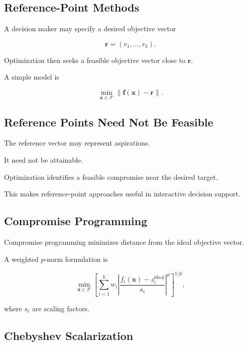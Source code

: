 \subsection{Reference-Point Methods}
\label{subsec:reference-point-methods}

A decision maker may specify a desired objective vector

\[
\boxed{
\mathbf{r}
=
(r_1,\ldots,r_k).
}
\]

Optimization then seeks a feasible objective vector close to
\(\mathbf{r}\).

A simple model is

\[
\boxed{
\min_{\mathbf{x}\in\mathcal{F}}
\|
\mathbf{f}(\mathbf{x})
-
\mathbf{r}
\|.
}
\]

\subsection{Reference Points Need Not Be Feasible}
\label{subsec:reference-points-feasibility}

The reference vector may represent aspirations.

It need not be attainable.

Optimization identifies a feasible compromise near the desired target.

This makes reference-point approaches useful in interactive decision
support.

\subsection{Compromise Programming}
\label{subsec:compromise-programming}

Compromise programming minimizes distance from the ideal objective vector.

A weighted \(p\)-norm formulation is

\[
\boxed{
\min_{\mathbf{x}\in\mathcal{F}}
\left[
\sum_{i=1}^{k}
w_i
\left|
\frac{
f_i(\mathbf{x})
-
z_i^{\mathrm{ideal}}
}{
s_i
}
\right|^p
\right]^{1/p},
}
\]

where \(s_i\) are scaling factors.

\subsection{Chebyshev Scalarization}
\label{subsec:chebyshev-scalarization}

